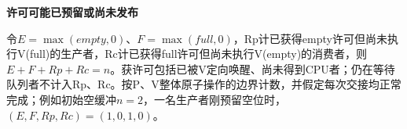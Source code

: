 {\color{ink}\bfseries 许可可能已预留或尚未发布}\par\vspace{1bp}令\(E=\allowbreak{}\operatorname{max}(empty,\allowbreak{}0)\)、\(F=\allowbreak{}\operatorname{max}(full,\allowbreak{}0)\)，Rp计已获得empty许可但尚未执行V(full)的生产者，Rc计已获得full许可但尚未执行V(empty)的消费者，则\(E+\allowbreak{}F+\allowbreak{}Rp+\allowbreak{}Rc=\allowbreak{}n\)。获许可包括已被V定向唤醒、尚未得到CPU者；仍在等待队列者不计入Rp、Rc。按P、V整体原子操作的边界计数，并假定每次交接均正常完成；例如初始空缓冲\(n=\allowbreak{}2\)，一名生产者刚预留空位时，\((E,\allowbreak{}F,\allowbreak{}Rp,\allowbreak{}Rc)=\allowbreak{}(1,\allowbreak{}0,\allowbreak{}1,\allowbreak{}0)\)。
